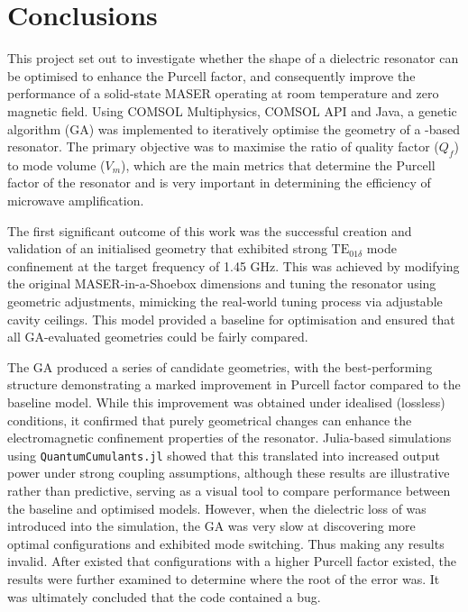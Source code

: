 \chapter{Conclusions}
This project set out to investigate whether the shape of a dielectric resonator
can be optimised to enhance the Purcell factor, and consequently improve the
performance of a solid-state MASER operating at room temperature and zero
magnetic field. Using COMSOL Multiphysics\textregistered{}, COMSOL API and Java,
a genetic algorithm (GA) was implemented to iteratively optimise the geometry of
a -based resonator. The primary objective was to maximise the ratio
of quality factor ($Q_f$) to mode volume ($V_m$), which are the main metrics
that determine the Purcell factor of the resonator and is very important in
determining the efficiency of microwave amplification.

The first significant outcome of this work was the successful creation and
validation of an initialised geometry that exhibited strong
$\text{TE}_{01\delta}$ mode confinement at the target frequency of 1.45 GHz.
This was achieved by modifying the original MASER-in-a-Shoebox dimensions and
tuning the resonator using geometric adjustments, mimicking the real-world
tuning process via adjustable cavity ceilings. This model provided a baseline
for optimisation and ensured that all GA-evaluated geometries could be fairly
compared.

The GA produced a series of candidate geometries, with the best-performing
structure demonstrating a marked improvement in Purcell factor compared to the
baseline model. While this improvement was obtained under idealised (lossless)
conditions, it confirmed that purely geometrical changes can enhance the
electromagnetic confinement properties of the resonator. Julia-based simulations
using \texttt{QuantumCumulants.jl} showed that this translated into increased
output power under strong coupling assumptions, although these results are
illustrative rather than predictive, serving as a visual tool to compare
performance between the baseline and optimised models. However, when the
dielectric loss of  was introduced into the simulation, the GA was
very slow at discovering more optimal configurations and exhibited mode
switching. Thus making any results invalid. After existed that configurations
with a higher Purcell factor existed, the results were further examined to
determine where the root of the error was. It was ultimately concluded that the
code contained a bug.

